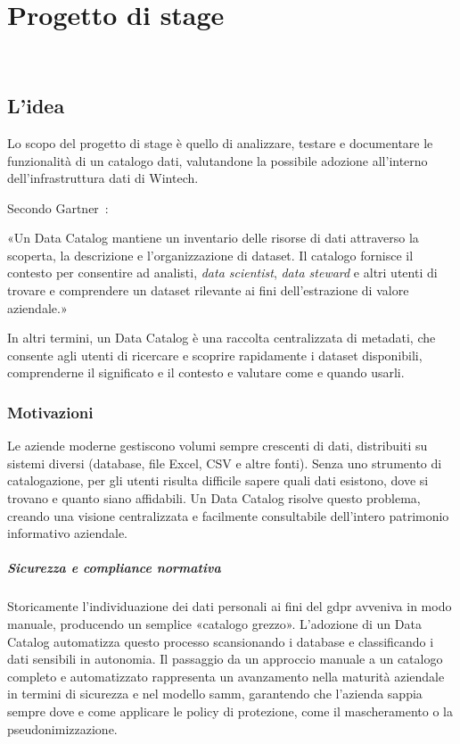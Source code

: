 \chapter{Progetto di stage}
\label{cap:progetto-di-stage}

\\

\section{L'idea}
Lo scopo del progetto di stage è quello di analizzare, testare e documentare le funzionalità di un catalogo dati, valutandone la possibile adozione all'interno dell'infrastruttura dati di Wintech.

Secondo Gartner~\cite{gartner:data-catalog-2017}:
\begin{quoting}
    «Un Data Catalog mantiene un inventario delle risorse di dati attraverso la scoperta, la descrizione e l'organizzazione di dataset. Il catalogo 
    fornisce il contesto per consentire ad analisti, \emph{data scientist}, \emph{data steward} e altri utenti di trovare e comprendere un dataset rilevante ai fini dell'estrazione di valore aziendale.»
\end{quoting}

In altri termini, un Data Catalog è una raccolta centralizzata di metadati, che consente agli utenti di ricercare e scoprire rapidamente i dataset disponibili, 
comprenderne il significato e il contesto e valutare come e quando usarli.

\subsection{Motivazioni}
Le aziende moderne gestiscono volumi sempre crescenti di dati, distribuiti su sistemi diversi (database, file Excel, CSV e altre fonti). Senza uno strumento di catalogazione, per gli utenti 
risulta difficile sapere quali dati esistono, dove si trovano e quanto siano affidabili. Un Data Catalog risolve questo problema, creando una visione centralizzata e facilmente consultabile dell'intero patrimonio informativo aziendale.

\paragraph{Sicurezza e compliance normativa}
Storicamente l'individuazione dei dati personali ai fini del \gls{gdpr} avveniva in modo manuale, producendo un semplice «catalogo grezzo». 
L'adozione di un Data Catalog automatizza questo processo scansionando i database e classificando i dati sensibili in autonomia.
Il passaggio da un approccio manuale a un catalogo completo e automatizzato rappresenta un avanzamento nella maturità aziendale in termini di sicurezza e nel modello \gls{samm}, 
garantendo che l'azienda sappia sempre dove e come applicare le policy di protezione, come il mascheramento o la pseudonimizzazione.

